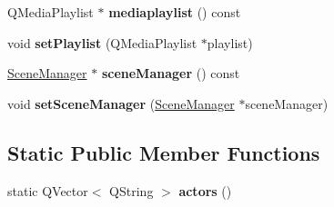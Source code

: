 \begin{DoxyCompactItemize}
\item 
\mbox{\label{classmfg_1_1_engine_a8d31d4eb54252e8523775f8dff145a92}} 
Q\+Media\+Playlist $\ast$ {\bfseries mediaplaylist} () const
\item 
\mbox{\label{classmfg_1_1_engine_a296fdd5e8062a6cb7214bb3a44bc70e6}} 
void {\bfseries set\+Playlist} (Q\+Media\+Playlist $\ast$playlist)
\item 
\mbox{\label{classmfg_1_1_engine_acba63454459c76adbea96bc609669491}} 
\hyperlink{class_scene_manager}{Scene\+Manager} $\ast$ {\bfseries scene\+Manager} () const
\item 
\mbox{\label{classmfg_1_1_engine_ac673b51dbad9a39968d1e5a57c92b040}} 
void {\bfseries set\+Scene\+Manager} (\hyperlink{class_scene_manager}{Scene\+Manager} $\ast$scene\+Manager)
\end{DoxyCompactItemize}
\subsection*{Static Public Member Functions}
\begin{DoxyCompactItemize}
\item 
\mbox{\label{classmfg_1_1_engine_a826e8e5359c8f5f2516fb7e4ad8ae3a0}} 
static Q\+Vector$<$ Q\+String $>$ {\bfseries actors} ()
\end{DoxyCompactItemize}
